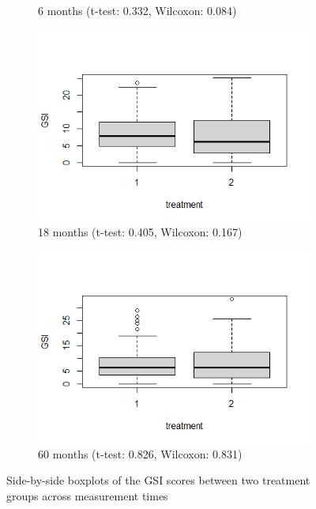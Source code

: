 \begin{figure}[H]
\begin{subfigure}{.19\textwidth}
  \caption{6 months (t-test: 0.332, Wilcoxon: 0.084)}
\end{subfigure}
\begin{subfigure}{.19\textwidth}
  \includegraphics[width=1\linewidth]{../../plots/box_between_group_18.png}
  \caption{18 months (t-test: 0.405, Wilcoxon: 0.167)}
\end{subfigure}
\begin{subfigure}{.19\textwidth}
  \includegraphics[width=1\linewidth]{../../plots/box_between_group_60.png}
  \caption{60 months (t-test: 0.826, Wilcoxon: 0.831)}
\end{subfigure}
\caption{Side-by-side boxplots of the GSI scores between two treatment groups across measurement times}
\label{fig:boxplot.between.groups}
\end{figure}

